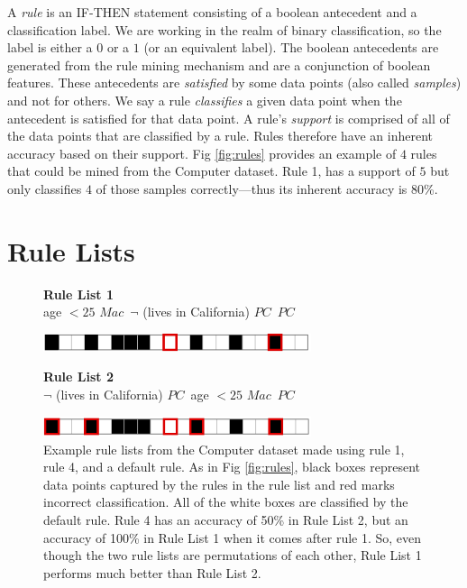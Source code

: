 A \textit{rule} is an IF-THEN statement consisting of a boolean antecedent and a classification label.
We are working in the realm of binary classification, so the label is either a $0$ or a $1$ (or an equivalent label).
The boolean antecedents are generated from the rule mining mechanism \cite{LethamRuMcMa15} and are a conjunction of boolean features.
These antecedents are \textit{satisfied} by some data points (also called \textit{samples}) and not for others.
We say a rule \textit{classifies} a given data point when the antecedent is satisfied for that data point.
A rule's \textit{support} is comprised of all of the data points that are classified by a rule.
Rules therefore have an inherent accuracy based on their support.
Fig \ref{fig:rules} provides an example of $4$ rules that could be mined from the Computer dataset.
Rule 1, has a support of $5$ but only classifies $4$ of those samples correctly---thus its inherent accuracy is $80$\%.

\section{Rule Lists}

\begin{figure}[t!]
\begin{algorithmic}
\normalsize

\State \textbf{Rule List 1}\\
\State \bif age $< 25$ \bthen $Mac$\,
\State \belif $\neg$ (lives in California) \bthen $PC$\,
\State \belse $PC$

\begin{raggedleft}
\includegraphics[width=0.7\textwidth]{figs/rule_list_1_cap.png}
\end{raggedleft}

\State \textbf{Rule List 2}\\
\State \bif $\neg$ (lives in California) \bthen $PC$\,
\State \belif age $< 25$ \bthen $Mac$\,
\State \belse $PC$

\begin{raggedleft}
\includegraphics[width=0.7\textwidth]{figs/rule_list_2_cap.png}
\end{raggedleft}

\end{algorithmic}
\caption{Example rule lists from the Computer dataset made using rule 1, rule 4, and a default rule.
As in Fig \ref{fig:rules}, black boxes represent data points captured by the rules in the rule list and red marks incorrect classification.
All of the white boxes are classified by the default rule.
Rule 4 has an accuracy of 50\% in Rule List 2, but an accuracy of 100\% in Rule List 1 when it comes after rule 1.
So, even though the two rule lists are permutations of each other, Rule List 1 performs much better than Rule List 2.}
\label{fig:rule-list-computer}
\end{figure}

